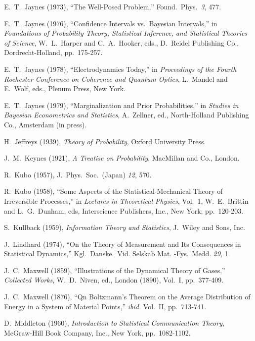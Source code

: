 \begin{itemize}[label={}, leftmargin=*, itemsep={0.5\baselineskip plus 2pt}]
 E.~T.~Jaynes (1973), ``The Well-Posed Problem,'' Found.~Phys.~\emph{3}, 477.

 E.~T.~Jaynes (1976), ``Confidence Intervals vs.~Bayesian Intervals,'' in \emph{Foundations of Probability Theory, Statistical Inference, and Statistical Theories of Science}, W.~L.~Harper and C.~A.~Hooker, eds., D.~Reidel Publishing Co., Dordrecht-Holland, pp.~175-257.

 E.~T.~Jaynes (1978), ``Electrodynamics Today,'' in \emph{Proceedings of the Fourth Rochester Conference on Coherence and Quantum Optics}, L.~Mandel and E.~Wolf, eds., Plenum Press, New York.

 E.~T.~Jaynes (1979), ``Marginalization and Prior Probabilities,'' in \emph{Studies in Bayesian Econometrics and Statistics}, A.~Zellner, ed., North-Holland Publishing Co., Amsterdam (in press).

 H.~Jeffreys (1939), \emph{Theory of Probability}, Oxford University Press.

 J.~M.~Keynes (1921), \emph{A Treatise on Probability}, MacMillan and Co., London.

 R.~Kubo (1957), J.~Phys.~Soc.~(Japan) \emph{12}, 570.

 R.~Kubo (1958), ``Some Aspects of the Statistical-Mechanical Theory of Irreversible Processes,'' in \emph{Lectures in Theoretical Physics}, Vol.~1, W.~E.~Brittin and L.~G.~Dunham, eds, Interscience Publishers, Inc., New York; pp.~120-203.

 S.~Kullback (1959), \emph{Information Theory and Statistics}, J.~Wiley and Sons, Inc.

 J.~Lindhard (1974), ``On the Theory of Measurement and Its Consequences in Statistical Dynamics,'' Kgl.~Danske.~Vid. Selskab Mat. \mbox{-Fys}.~Medd. \emph{29}, 1.

 J.~C.~Maxwell (1859), ``Illustrations of the Dynamical Theory of Gases,'' \emph{Collected Works}, W.~D.~Niven, ed., London (1890), Vol.~I, pp.~377-409.

 J.~C.~Maxwell (1876), ``Qn Boltzmann's Theorem on the Average Distribution of Energy in a System of Material Points,'' \emph{ibid.} Vol.~II, pp.~713-741.

 D.~Middleton (1960), \emph{Introduction to Statistical Communication Theory}, Mc\-Graw-Hill Book Company, Inc., New York, pp.~1082-1102.


\end{itemize}
